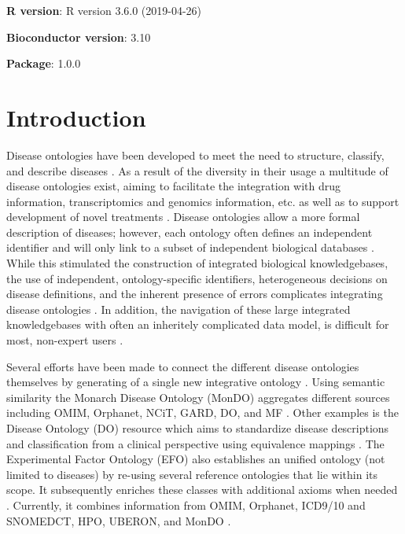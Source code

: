 \documentclass[9pt,a4paper,]{extarticle}
\begin{document}
\clearpage
\pagestyle{main}

\textbf{R version}: R version 3.6.0 (2019-04-26)

\textbf{Bioconductor version}: 3.10

\textbf{Package}: 1.0.0

\hypertarget{introduction}{%
\section{Introduction}\label{introduction}}

Disease ontologies have been developed to meet the need to structure, classify, and describe diseases \citep{Gruber1993, Haendel2018, Hoehndorf2013}. As a result of the diversity in their usage a multitude of disease ontologies exist, aiming to facilitate the integration with drug information, transcriptomics and genomics information, etc. as well as to support development of novel treatments \citep{Haendel2018, Hoehndorf2013, Rappaport2013}. Disease ontologies allow a more formal description of diseases; however, each ontology often defines an independent identifier and will only link to a subset of independent biological databases \citep{Hasnain2014, Hoehndorf2013, Kibbe2015, Livingston2015, Malone2010, Rappaport2013}. While this stimulated the construction of integrated biological knowledgebases, the use of independent, ontology-specific identifiers, heterogeneous decisions on disease definitions, and the inherent presence of errors complicates integrating disease ontologies \citep{Livingston2015, Rappaport2013}. In addition, the navigation of these large integrated knowledgebases with often an inheritely complicated data model, is difficult for most, non-expert users \citep{Hasnain2014, Hu2017, Livingston2015}.

Several efforts have been made to connect the different disease ontologies themselves by generating of a single new integrative ontology \citep{Mungall2017, Shefchek2019, Rappaport2013}. Using semantic similarity the Monarch Disease Ontology (MonDO) aggregates different sources including OMIM, Orphanet, NCiT, GARD, DO, and MF \citep{Mungall2017, Shefchek2019}. Other examples is the Disease Ontology (DO) resource which aims to standardize disease descriptions and classification from a clinical perspective using equivalence mappings \citep{Cheng2013, Schriml2015, Yu2015}. The Experimental Factor Ontology (EFO) also establishes an unified ontology (not limited to diseases) by re-using several reference ontologies that lie within its scope. It subsequently enriches these classes with additional axioms when needed \citep{Malone2010}. Currently, it combines information from OMIM, Orphanet, ICD9/10 and SNOMEDCT, HPO, UBERON, and MonDO \citep{EFO2019}.
\end{document}
